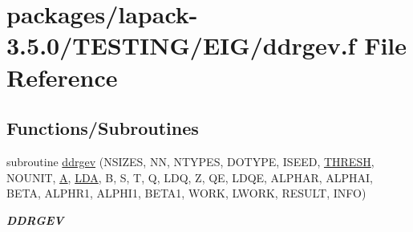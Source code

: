 \hypertarget{ddrgev_8f}{}\section{packages/lapack-\/3.5.0/\+T\+E\+S\+T\+I\+N\+G/\+E\+I\+G/ddrgev.f File Reference}
\label{ddrgev_8f}
\subsection*{Functions/\+Subroutines}
\begin{DoxyCompactItemize}
\item 
subroutine \hyperlink{group__double__eig_ga5dd9ec32424dde4c58b7f7b35365e879}{ddrgev} (N\+S\+I\+Z\+E\+S, N\+N, N\+T\+Y\+P\+E\+S, D\+O\+T\+Y\+P\+E, I\+S\+E\+E\+D, \hyperlink{zlaqgs_8c_a0656018abfc9fa2821827415f5d5ea57}{T\+H\+R\+E\+S\+H}, N\+O\+U\+N\+I\+T, \hyperlink{classA}{A}, \hyperlink{example__user_8c_ae946da542ce0db94dced19b2ecefd1aa}{L\+D\+A}, B, S, T, Q, L\+D\+Q, Z, Q\+E, L\+D\+Q\+E, A\+L\+P\+H\+A\+R, A\+L\+P\+H\+A\+I, B\+E\+T\+A, A\+L\+P\+H\+R1, A\+L\+P\+H\+I1, B\+E\+T\+A1, W\+O\+R\+K, L\+W\+O\+R\+K, R\+E\+S\+U\+L\+T, I\+N\+F\+O)
\begin{DoxyCompactList}\small\item\em {\bfseries D\+D\+R\+G\+E\+V} \end{DoxyCompactList}\end{DoxyCompactItemize}
